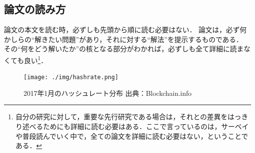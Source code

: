 \subsection{論文の読み方}
\label{background:readpaper}
論文の本文を読む時，必ずしも先頭から順に読む必要はない．
論文は，必ず何かしらの``解きたい問題''があり，それに対する``解法''を提示するものである．
その``何をどう解いたか''の核となる部分がわかれば，必ずしも全て詳細に読まなくても良い\footnote{自分の研究に対して，重要な先行研究である場合は，それとの差異をはっきり述べるためにも詳細に読む必要はある．ここで言っているのは，サーベイや普段読んでいく中で，全ての論文を詳細に読む必要はない，ということである．}．





\begin{figure}[h]
    \begin{center}
        \texttt{[image: ./img/hashrate.png]}
        \caption{2017年1月のハッシュレート分布 出典：Blockchain.info\cite{bitcoinhashrate}}
        \label{img:hashrate}
    \end{center}
\end{figure}
\fi
